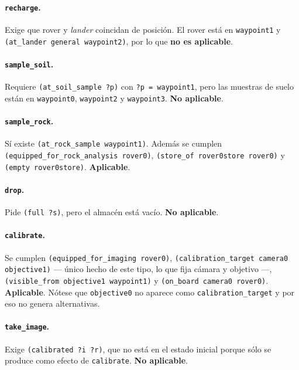 \documentclass[12pt,a4paper]{article}
\begin{document}
\paragraph{\texttt{recharge}.}
Exige que rover y \emph{lander} coincidan de posici\'on. El rover est\'a en
\texttt{waypoint1} y \texttt{(at\_lander general waypoint2)}, por lo que
\textbf{no es aplicable}.

\paragraph{\texttt{sample\_soil}.}
Requiere \texttt{(at\_soil\_sample ?p)} con \texttt{?p\,=\,waypoint1}, pero
las muestras de suelo est\'an en \texttt{waypoint0}, \texttt{waypoint2} y
\texttt{waypoint3}. \textbf{No aplicable}.

\paragraph{\texttt{sample\_rock}.}
S\'i existe \texttt{(at\_rock\_sample waypoint1)}. Adem\'as se cumplen
\texttt{(equipped\_for\_rock\_analysis rover0)},
\texttt{(store\_of rover0store rover0)} y \texttt{(empty rover0store)}.
\textbf{Aplicable}.

\paragraph{\texttt{drop}.}
Pide \texttt{(full ?s)}, pero el almac\'en est\'a vac\'io.
\textbf{No aplicable}.

\paragraph{\texttt{calibrate}.}
Se cumplen \texttt{(equipped\_for\_imaging rover0)},
\texttt{(calibration\_target camera0 objective1)} --- \'unico hecho de este
tipo, lo que fija c\'amara y objetivo ---,
\texttt{(visible\_from objective1 waypoint1)} y
\texttt{(on\_board camera0 rover0)}. \textbf{Aplicable}. N\'otese que
\texttt{objective0} no aparece como \texttt{calibration\_target} y por eso
no genera alternativas.

\paragraph{\texttt{take\_image}.}
Exige \texttt{(calibrated ?i ?r)}, que no est\'a en el estado inicial porque
s\'olo se produce como efecto de \texttt{calibrate}. \textbf{No aplicable}.
\end{document}
